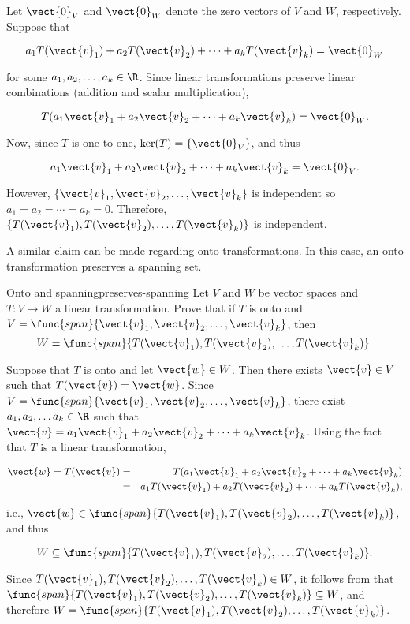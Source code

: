 \begin{solution}
Let $\vect{0}_V$ and $\vect{0}_W$ denote the zero vectors of $V$ and $W$,
respectively.
Suppose that 

\[ a_1T(\vect{v}_1) + a_2T(\vect{v}_2) +\cdots +a_kT(\vect{v}_k) =\vect{0}_W \]

for some $a_1, a_2, \ldots, a_k\in\R$.
Since linear transformations preserve linear combinations (addition
and scalar multiplication),

\[ T(a_1\vect{v}_1 + a_2\vect{v}_2 +\cdots +a_k\vect{v}_k) =\vect{0}_W. \]

Now, since $T$ is one to one, $\ker(T)=\{\vect{0}_V\}$, and thus

\[ a_1\vect{v}_1 + a_2\vect{v}_2 +\cdots +a_k\vect{v}_k =\vect{0}_V. \]

\noindent However, $\{\vect{v}_1, \vect{v}_2, \ldots, \vect{v}_k\}$ is independent so $a_1=a_2=\cdots=a_k=0$.
Therefore, $\{T(\vect{v}_1), T(\vect{v}_2), \ldots, T(\vect{v}_k)\}$
is independent.
\end{solution}

A similar claim can be made regarding onto transformations. In this case, an onto transformation preserves a spanning set.

\begin{example}{Onto and spanning}{preserves-spanning}
Let $V$ and $W$ be vector spaces and $T:V\to W$ a linear
transformation.
Prove that if $T$ is onto and
$V=\func{span}\{\vect{v}_1, \vect{v}_2, \ldots, \vect{v}_k\}$,
then
\[ W=\func{span}\{T(\vect{v}_1), T(\vect{v}_2), \ldots, T(\vect{v}_k)\}.\]
\end{example}

\begin{solution}
Suppose that $T$ is onto and let $\vect{w}\in W$.  
Then there exists $\vect{v}\in V$ such that $T(\vect{v})=\vect{w}$.
Since $V=\func{span}\{\vect{v}_1, \vect{v}_2, \ldots, \vect{v}_k\}$, there
exist $a_1, a_2, \ldots a_k\in\R$ such that 
$\vect{v} = a_1\vect{v}_1 + a_2\vect{v}_2 + \cdots + a_k\vect{v}_k$.
Using the fact that $T$ is a linear transformation,

\begin{eqnarray*}
\vect{w}=T(\vect{v})
& = & T(a_1\vect{v}_1 + a_2\vect{v}_2 + \cdots + a_k\vect{v}_k) \\
& = & a_1T(\vect{v}_1) + a_2T(\vect{v}_2) + \cdots + a_kT(\vect{v}_k),
\end{eqnarray*}

i.e., $\vect{w}\in\func{span}\{T(\vect{v}_1), T(\vect{v}_2), \ldots, T(\vect{v}_k)\}$,
and thus 

\[ W\subseteq \func{span}\{T(\vect{v}_1), T(\vect{v}_2), \ldots, T(\vect{v}_k)\}.\]

Since $T(\vect{v}_1), T(\vect{v}_2), \ldots, T(\vect{v}_k)\in W$, 
it follows from
that
$\func{span}\{T(\vect{v}_1), T(\vect{v}_2), \ldots, T(\vect{v}_k)\}\subseteq W$,
and therefore
$W=\func{span}\{T(\vect{v}_1), T(\vect{v}_2), \ldots, T(\vect{v}_k)\}$.
\end{solution}
